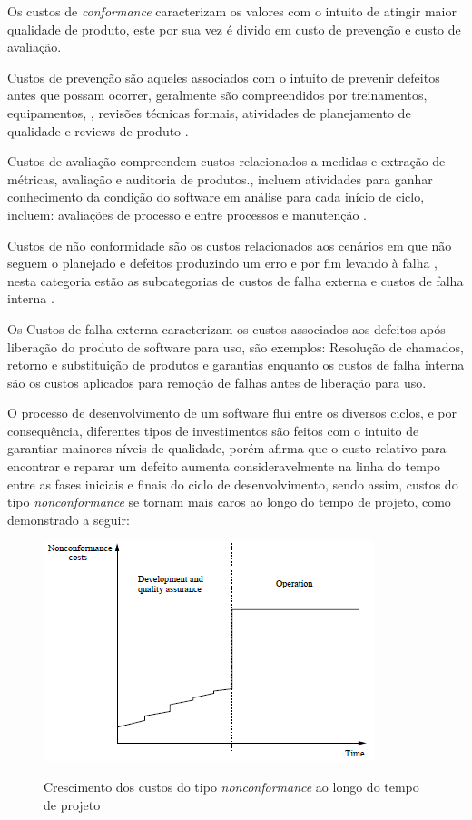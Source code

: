 \documentclass[
	12pt,				%
	oneside,			%
	a4paper,			%
	english,			%
	brazil				%
	]{abntex2ppgsi}
\begin{document}
Os custos de \textit{conformance} caracterizam os valores com o intuito de atingir maior qualidade de produto, este por sua vez é divido em custo de prevenção e custo de avaliação. \cite{ wagner2005}

Custos de prevenção são aqueles associados com o intuito de prevenir defeitos antes que possam ocorrer, geralmente são compreendidos por treinamentos, equipamentos, , revisões técnicas formais, atividades de planejamento de qualidade e reviews de produto \cite{wagner2005} \cite{pressman2009engenharia}.

Custos de avaliação compreendem custos relacionados a medidas e extração de métricas, avaliação e auditoria de produtos.\cite{wagner2005}, incluem atividades para ganhar conhecimento da condição do software em análise para cada início de ciclo, incluem: avaliações de processo e entre processos e manutenção \cite{pressman2009engenharia}.

Custos de não conformidade são os custos relacionados aos cenários em que não seguem o planejado e defeitos produzindo um erro e por fim levando à falha \cite{wagner2005}, nesta categoria estão as subcategorias de custos de falha externa e custos de falha interna \cite{pressman2009engenharia}. 

Os Custos de falha externa caracterizam os custos associados aos defeitos após liberação do produto de software para uso, são exemplos: Resolução de chamados, retorno e substituição de produtos e garantias \cite{pressman2009engenharia} enquanto os custos de falha interna são os custos aplicados para remoção de falhas antes de liberação para uso.

O processo de desenvolvimento de um software flui entre os diversos ciclos, e por consequência, diferentes tipos de investimentos são feitos com o intuito de garantiar mainores níveis de qualidade, porém \cite{pressman2009engenharia} afirma que o custo relativo para encontrar e reparar um defeito aumenta consideravelmente na linha do tempo entre as fases iniciais e finais do ciclo de desenvolvimento, sendo assim, custos do tipo \textit{nonconformance} se tornam mais caros ao longo do tempo de projeto, como demonstrado a seguir:

\begin{figure}[H]%
	\centering
 	  \caption{Crescimento dos custos do tipo \textit{nonconformance} ao longo do tempo de projeto}
		\includegraphics{nonconformance-costs-timeline.png}
	\label{fig:framework-teste}
\end{figure}
\end{document}
